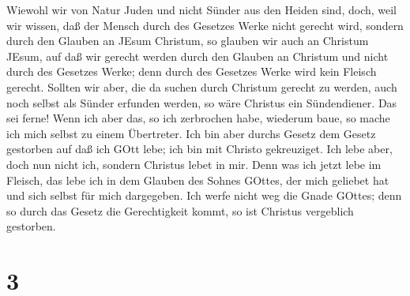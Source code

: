  Wiewohl wir von Natur Juden und nicht Sünder aus den
Heiden sind,  doch, weil wir wissen, daß der Mensch durch
des Gesetzes Werke nicht gerecht wird, sondern durch den Glauben an
JEsum Christum, so glauben wir auch an Christum JEsum, auf daß wir
gerecht werden durch den Glauben an Christum und nicht durch des
Gesetzes Werke; denn durch des Gesetzes Werke wird kein Fleisch gerecht.
 Sollten wir aber, die da suchen durch Christum gerecht zu
werden, auch noch selbst als Sünder erfunden werden, so wäre Christus
ein Sündendiener. Das sei ferne!  Wenn ich aber das, so ich
zerbrochen habe, wiederum baue, so mache ich mich selbst zu einem
Übertreter.  Ich bin aber durchs Gesetz dem Gesetz
gestorben auf daß ich GOtt lebe; ich bin mit Christo gekreuziget.
 Ich lebe aber, doch nun nicht ich, sondern Christus lebet
in mir. Denn was ich jetzt lebe im Fleisch, das lebe ich in dem Glauben
des Sohnes GOttes, der mich geliebet hat und sich selbst für mich
dargegeben.  Ich werfe nicht weg die Gnade GOttes; denn so
durch das Gesetz die Gerechtigkeit kommt, so ist Christus vergeblich
gestorben.

\hypertarget{section-2}{%
\section{3}\label{section-2}}


